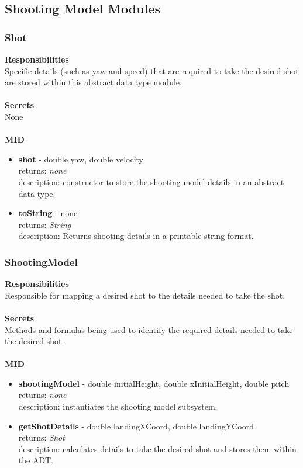 \documentclass[11pt]{article}
\begin{document}
\subsection{Shooting Model Modules}
\subsubsection*{Shot}
\textbf{Responsibilities} \\
Specific details (such as yaw and speed) that are required to take the desired shot are stored within this abstract data type module. \\ \\
\textbf{Secrets} \\ 
None \\  \\
\textbf{MID} 
\begin{itemize}
\item \textbf{shot} - double yaw, double velocity \\ returns: \textit{none} \\ description: constructor to store the shooting model details in an abstract data type.
\item \textbf{toString} - none \\ returns: \textit{String} \\ description: Returns shooting details in a printable string format.
\end{itemize}

\subsubsection*{ShootingModel}
\textbf{Responsibilities} \\
Responsible for mapping a desired shot to the details needed to take the shot. \\ \\
\textbf{Secrets} \\ 
Methods and formulas being used to identify the required details needed to take the desired shot. \\  \\
\textbf{MID} 
\begin{itemize}
\item \textbf{shootingModel} - double  initialHeight, double xInitialHeight, double pitch \\ returns: \textit{none} \\ description: instantiates the shooting model subsystem.
\item \textbf{getShotDetails} - double landingXCoord, double landingYCoord \\ returns: \textit{Shot} \\ description: calculates details to take the desired shot and stores them within the ADT.
\end{itemize}
\end{document}
